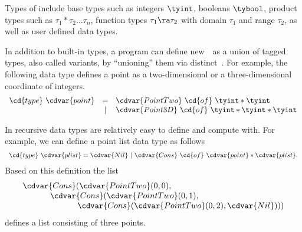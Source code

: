 \begin{cluster}
\label{grp:grm:sparc::built-in-types}

\begin{gram}
\label{grm:sparc::built-in-types}
Types of \pml include base types such as integers $\tyint$, booleans
$\tybool$, product types such as $\tau_1 * \tau_2 \ldots \tau_n$,
function types $\tau_1 \ra \tau_2$ with domain $\tau_1$ and range
$\tau_2$, as well as user defined data types.

\end{gram}
\end{cluster}

\begin{cluster}
\label{grp:grm:sparc::data-types}

\begin{gram}
\label{grm:sparc::data-types}
In addition to built-in types, a program can define new~~as a
union of tagged types, also called variants, by ``unioning'' them via
distinct~.
For example, the following data type defines a point as a
two-dimensional or a three-dimensional coordinate of integers.
\[
\begin{array}{lcl}
\cd{type}~\cdvar{point} & = & \cdvar{PointTwo}~\cd{of}~\tyint * \tyint
\\
           & | & \cdvar{Point3D}~\cd{of}~\tyint * \tyint * \tyint
\end{array} 
\]

\end{gram}
\end{cluster}

\begin{cluster}
\label{grp:grm:sparc::recursive-data-types}

\begin{gram}
\label{grm:sparc::recursive-data-types}
In \pml recursive data types are relatively easy to define and compute
with. For example, we can define a point list data type as follows
\[
\begin{array}{l}
\cd{type}~\cdvar{plist} = \cdvar{Nil}~|~\cdvar{Cons}~\cd{of}~\cdvar{point} * \cdvar{plist}.
\end{array}
\] 
Based on this definition the list 
\[
\begin{array}{l}
\cdvar{Cons}(\cdvar{PointTwo} (0,0),  
\\
~~~~~~~~~~\cdvar{Cons}(\cdvar{PointTwo} (0,1), 
\\
~~~~~~~~~~~~~~~~~~~~\cdvar{Cons}(\cdvar{PointTwo}(0,2), \cdvar{Nil})))  
\end{array} 
\]
defines a list consisting of three points.

\end{gram}
\end{cluster}

